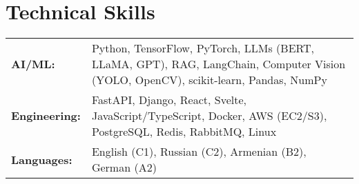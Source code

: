 \documentclass{ExpressiveResume}
\begin{document}



\section{Technical Skills}
\begin{tabularx}{\textwidth}{@{}>{\bfseries}l X@{}}
AI/ML:        & Python, TensorFlow, PyTorch, LLMs (BERT, LLaMA, GPT), RAG, LangChain, Computer Vision (YOLO, OpenCV), scikit-learn, Pandas, NumPy \\
Engineering:  & FastAPI, Django, React, Svelte, JavaScript/TypeScript, Docker, AWS (EC2/S3), PostgreSQL, Redis, RabbitMQ, Linux \\
Languages:    & English (C1), Russian (C2), Armenian (B2), German (A2) \\
\end{tabularx}
\end{document}
